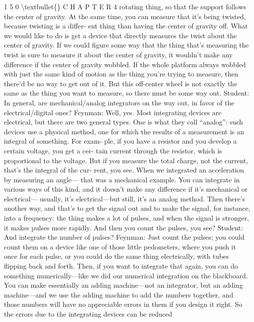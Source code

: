 \documentclass[10pt,oneside]{article}
\begin{document}
1 5 0 \textbackslash{}textbullet\{\} C H A P T E R  4 rotating thing, so that the support follows the center of gravity. At the same time, you can measure that it’s being twisted, because twisting is a differ- ent thing than having the center of gravity off. What we would like to do is get a device that directly measures the twist about the center of gravity. If we could figure some way that the thing that’s measuring the twist is sure to measure it about the center of gravity, it wouldn’t make any difference if the center of gravity wobbled. If the whole platform always wobbled with just the same kind of motion as the thing you’re trying to measure, then there’d be no way to get out of it. But this off-center wheel is not exactly the same as the thing you want to measure, so there must be some way out. Student: In general, are mechanical/analog integrators on the way out, in favor of the electrical/digital ones? Feynman: Well, yes. Most integrating devices are electrical, but there are two general types. One is what they call “analog”: such devices use a physical method, one for which the results of a measurement is an integral of something. For exam- ple, if you have a resistor and you develop a certain voltage, you get a cer- tain current through the resistor, which is proportional to the voltage. But if you measure the total charge, not the current, that’s the integral of the cur- rent, you see. When we integrated an acceleration by measuring an angle--- that was a mechanical example. You can integrate in various ways of this kind, and it doesn’t make any difference if it’s mechanical or electrical--- usually, it’s electrical---but still, it’s an analog method. Then there’s another way, and that’s to get the signal out and to make the signal, for instance, into a frequency: the thing makes a lot of pulses, and when the signal is stronger, it makes pulses more rapidly. And then you count the pulses, you see? Student: And integrate the number of pulses? Feynman: Just count the pulses; you could count them on a device like one of those little pedometers, where you push it once for each pulse, or you could do the same thing electrically, with tubes flipping back and forth. Then, if you want to integrate that again, you can do something numerically---like we did our numerical integration on the blackboard. You can make essentially an adding machine---not an integrator, but an adding machine---and we use the adding machine to add the numbers together, and those numbers will have no appreciable errors in them if you design it right. So the errors due to the integrating devices can be reduced\par
\end{document}
